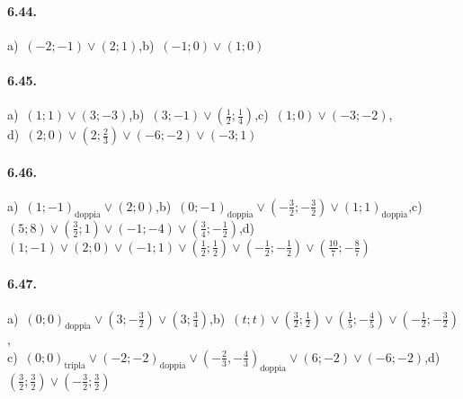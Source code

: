 \paragraph{6.44.} a)~$(-2;-1)\vee(2;1)$,\quad b)~$(-1;0)\vee(1;0)$

\paragraph{6.45.} a)~$(1;1)\vee(3;-3)$,\quad b)~$(3;-1)\vee\left(\frac 1 2;\frac 1 4\right)$,\quad c)~$(1;0)\vee(-3;-2)$,\protect\\
\quad d)~$(2;0)\vee\left(2;\frac 2 3\right)\vee(-6;-2)\vee(-3;1)$

\paragraph{6.46.} a)~$(1;-1)_\text{doppia} \vee(2;0)$,\quad b)~$(0;-1)_\text{doppia}\vee\left(-\frac 3 2;-\frac 3 2\right)\vee(1;1)_\text{doppia}$,\quad c)~$(5;8)\vee\left(\frac 3 2;1\right)\vee(-1;-4)\vee\left(\frac 3 4;-\frac 1 2\right)$,\quad d)~$(1;-1)\vee(2;0)\vee(-1;1)\vee\left(\frac 1 2;\frac 1 2\right)\vee\left(-\frac 1 2;-\frac 1 2\right)\vee\left(\frac{10} 7;-\frac 8 7\right)$

\paragraph{6.47.}a)~$(0;0)_\text{doppia}\vee\left(3;-\frac 3 2\right)\vee(3;\frac 3 4)$,\quad b)~$(t;t)\vee\left(\frac 3 2;\frac 1 2\right)\vee\left(\frac 1 5;-\frac 4 5\right)\vee\left(-\frac 1 2;-\frac 3 2\right)$,\protect\\
\quad c)~$(0;0)_\text{tripla}\vee(-2;-2)_\text{doppia}\vee\left(-\frac 2 3,-\frac 4 3\right)_\text{doppia}\vee(6;-2)\vee(-6;-2)$,\quad d)~$\left(\frac 3 2;\frac 3 2\right)\vee\left(-\frac 3 2;\frac 3 2\right)$

